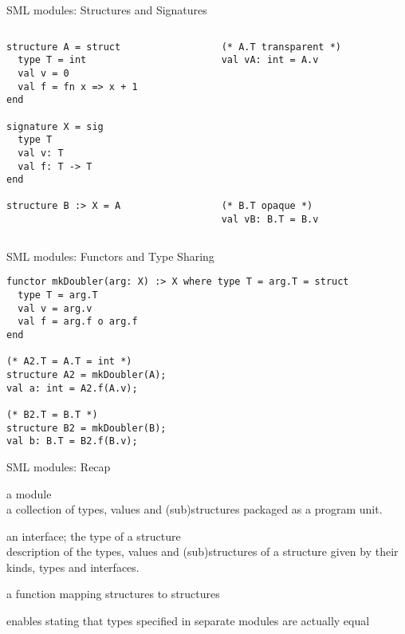 \documentclass{beamer}
\begin{document}
\begin{frame}[fragile]{SML modules: Structures and Signatures}
\begin{columns}
\begin{column}[t]{5cm}
\begin{verbatim}
structure A = struct
  type T = int
  val v = 0
  val f = fn x => x + 1
end

signature X = sig
  type T
  val v: T
  val f: T -> T
end

structure B :> X = A
\end{verbatim}
\end{column}
\begin{column}[t]{5cm}
\begin{verbatim}
(* A.T transparent *)
val vA: int = A.v










(* B.T opaque *)
val vB: B.T = B.v
\end{verbatim}
\end{column}
\end{columns}
\end{frame}

\begin{frame}[fragile]{SML modules: Functors and Type Sharing}
\begin{verbatim}
functor mkDoubler(arg: X) :> X where type T = arg.T = struct
  type T = arg.T
  val v = arg.v
  val f = arg.f o arg.f
end

(* A2.T = A.T = int *)
structure A2 = mkDoubler(A);
val a: int = A2.f(A.v);

(* B2.T = B.T *)
structure B2 = mkDoubler(B);
val b: B.T = B2.f(B.v);
\end{verbatim}
\end{frame}

\begin{frame}{SML modules: Recap}
\begin{description}
\item[structure] a module\\a collection of types, values and
  (sub)structures packaged as a program unit.
\item[signature] an interface; the type of a structure\\description of
  the types, values and (sub)structures of a structure given by their
  kinds, types and interfaces.
\item[functor] a function mapping structures to structures
\item[type-sharing] enables stating that types specified in separate
  modules are actually equal
\end{description}
\end{frame}
\end{document}
